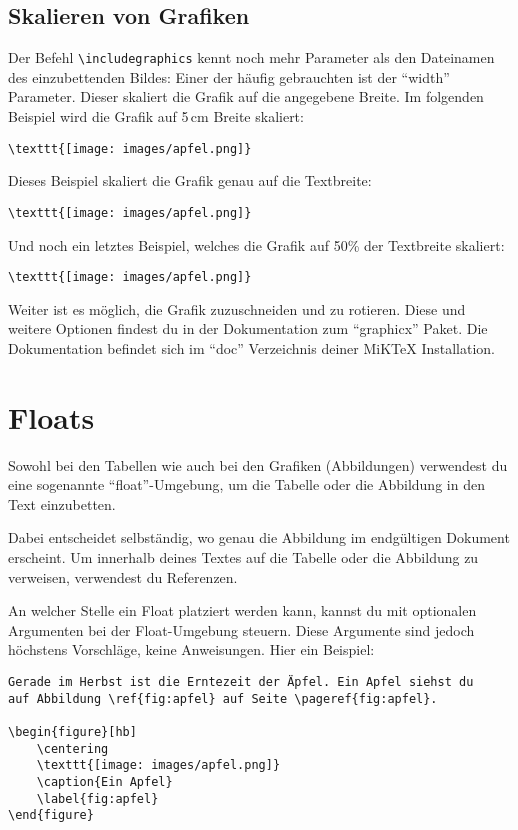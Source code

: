 \subsection{Skalieren von Grafiken}

Der Befehl \texttt{\textbackslash includegraphics} kennt noch mehr Parameter als den Dateinamen des einzubettenden Bildes: Einer der häufig gebrauchten ist der \enquote{width} Parameter. Dieser skaliert die Grafik auf die angegebene Breite. Im folgenden Beispiel wird die Grafik auf 5\,cm Breite skaliert:
\begin{lstlisting}
\texttt{[image: images/apfel.png]}
\end{lstlisting}

Dieses Beispiel skaliert die Grafik genau auf die Textbreite: 
\begin{lstlisting}
\texttt{[image: images/apfel.png]}
\end{lstlisting}

Und noch ein letztes Beispiel, welches die Grafik auf 50\% der Textbreite skaliert:
\begin{lstlisting}
\texttt{[image: images/apfel.png]}
\end{lstlisting}

Weiter ist es möglich, die Grafik zuzuschneiden und zu rotieren. Diese und weitere Optionen findest du in der Dokumentation zum \enquote{graphicx} Paket. Die Dokumentation befindet sich im \enquote{doc} Verzeichnis deiner MiKTeX Installation.

\section{Floats}

Sowohl bei den Tabellen wie auch bei den Grafiken (Abbildungen) verwendest du eine sogenannte \enquote{float}-Umgebung, um die Tabelle oder die Abbildung in den Text einzubetten.

Dabei entscheidet \DMLLaTeX{} selbständig, wo genau die Abbildung im endgültigen Dokument erscheint. Um innerhalb deines Textes auf die Tabelle oder die Abbildung zu verweisen, verwendest du Referenzen.

An welcher Stelle ein Float platziert werden kann, kannst du mit optionalen Argumenten bei der Float-Umgebung steuern. Diese Argumente sind jedoch höchstens Vorschläge, keine Anweisungen. Hier ein Beispiel:
\begin{lstlisting}
Gerade im Herbst ist die Erntezeit der Äpfel. Ein Apfel siehst du 
auf Abbildung \ref{fig:apfel} auf Seite \pageref{fig:apfel}.

\begin{figure}[hb]
	\centering
	\texttt{[image: images/apfel.png]}
	\caption{Ein Apfel}
	\label{fig:apfel}
\end{figure}
\end{lstlisting}

